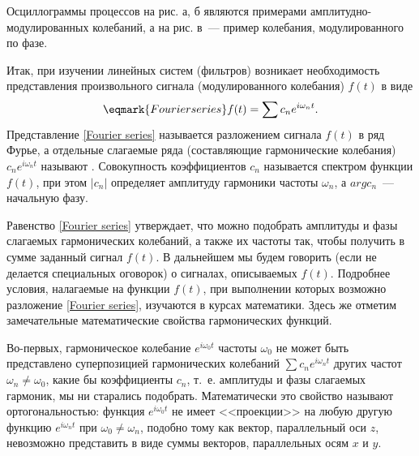 %

Осциллограммы процессов на рис. а, б являются
примерами амплиту\-дно-модулированных колебаний, а на рис. в~--- пример
колебания, модулированного по фазе.



Итак, при изучении линейных систем (фильтров) возникает необходимость
представления произвольного сигнала
(модулированного колебания) $f(t)$ в виде
\begin{equation}
    \eqmark{Fourier series}
    f(t)=\sum c_n e^{i\omega_n t}.
\end{equation}
Представление \eqref{Fourier series} называется разложением сигнала $f(t)$ в ряд
Фурье, а отдельные слагаемые ряда (составляющие
гармонические колебания) $c_n e^{i\omega_n t}$ называют .
Совокупность коэффициентов $c_n$ называется
спектром функции $f(t)$, при этом $|c_n|$ определяет амплитуду гармоники частоты
$\omega_n$, а $arg c_n$~--- начальную
фазу.

Равенство \eqref{Fourier series} утверждает, что можно подобрать амплитуды и
фазы слагаемых гармонических колебаний, а также их частоты
так, чтобы получить в сумме заданный сигнал $f(t)$. В дальнейшем мы будем
говорить (если не делается специальных
оговорок) о сигналах, описываемых  $f(t)$.
Подробнее условия, налагаемые на функции
$f(t)$, при выполнении которых возможно разложение \eqref{Fourier series},
изучаются в курсах математики. Здесь же отметим
замечательные математические свойства гармонических функций.

Во-первых, гармоническое колебание $e^{i\omega_0 t}$ частоты $\omega_0$ не может
быть представлено суперпозицией
гармонических колебаний $\sum c_n e^{i\omega_n t}$ других частот
$\omega_n\ne\omega_0$, какие бы коэффициенты $c_n$,
т.~е. амплитуды и фазы слагаемых гармоник, мы ни старались подобрать.
Математически это свойство называют
ортогональностью: функция $e^{i\omega_0 t}$ не имеет <<проекции>> на любую
другую функцию $e^{i\omega_nt}$ при
$\omega_0\ne\omega_n$, подобно тому как вектор, параллельный оси $z$, невозможно
представить в виде суммы векторов, параллельных осям $x$ и $y$.

